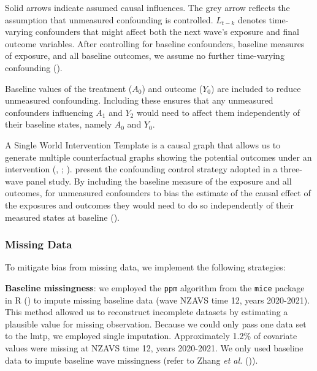 \documentclass[
  single column]{article}
\begin{document}
Solid arrows indicate assumed causal influences. The grey arrow reflects
the assumption that unmeasured confounding is controlled. \(L_{t-k}\)
denotes time-varying confounders that might affect both the next wave's
exposure and final outcome variables. After controlling for baseline
confounders, baseline measures of exposure, and all baseline outcomes,
we assume no further time-varying confounding
().

Baseline values of the treatment (\(A_0\)) and outcome (\(Y_0\)) are
included to reduce unmeasured confounding. Including these ensures that
any unmeasured confounders influencing \(A_1\) and \(Y_2\) would need to
affect them independently of their baseline states, namely \(A_0\) and
\(Y_0\).

\begin{table}

\caption{\label{tbl-swig}A Single World Intervention Template is a
causal graph that allows us to generate multiple counterfactual graphs
showing the potential outcomes under an intervention
(,
;
).
present the confounding control strategy adopted in a three-wave panel
study. By including the baseline measure of the exposure and all
outcomes, for unmeasured confounders to bias the estimate of the causal
effect of the exposures and outcomes they would need to do so
independently of their measured states at baseline
().}

\centering{

\tvfour

}

\end{table}%

\subsubsection{Missing Data}\label{missing-data}

To mitigate bias from missing data, we implement the following
strategies:

\textbf{Baseline missingness}: we employed the \texttt{ppm} algorithm
from the \texttt{mice} package in R () to impute missing baseline data (wave NZAVS time 12, years
2020-2021). This method allowed us to reconstruct incomplete datasets by
estimating a plausible value for missing observation. Because we could
only pass one data set to the lmtp, we employed single imputation.
Approximately 1.2\% of covariate values were missing at NZAVS time 12,
years 2020-2021. We only used baseline data to impute baseline wave
missingness (refer to Zhang \emph{et al.}
()).
\end{document}
